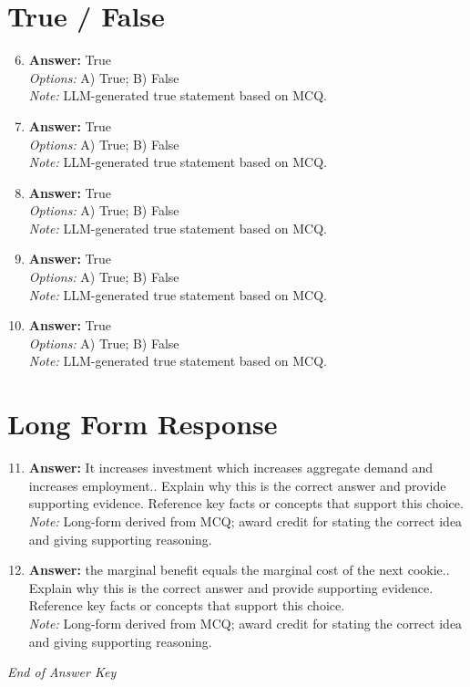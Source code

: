 \documentclass[12pt]{article}
\begin{document}
\section*{True / False}
\begin{enumerate}[label=\arabic*.]
\setcounter{enumi}{5}
\item \textbf{Answer:} True
\\ \textit{Options:} A) True; B) False
\\ \textit{Note:} LLM-generated true statement based on MCQ.
\item \textbf{Answer:} True
\\ \textit{Options:} A) True; B) False
\\ \textit{Note:} LLM-generated true statement based on MCQ.
\item \textbf{Answer:} True
\\ \textit{Options:} A) True; B) False
\\ \textit{Note:} LLM-generated true statement based on MCQ.
\item \textbf{Answer:} True
\\ \textit{Options:} A) True; B) False
\\ \textit{Note:} LLM-generated true statement based on MCQ.
\item \textbf{Answer:} True
\\ \textit{Options:} A) True; B) False
\\ \textit{Note:} LLM-generated true statement based on MCQ.
\end{enumerate}

\section*{Long Form Response}
\begin{enumerate}[label=\arabic*.]
\setcounter{enumi}{10}
\item \textbf{Answer:} It increases investment which increases aggregate demand and increases employment.. Explain why this is the correct answer and provide supporting evidence. Reference key facts or concepts that support this choice.
\\ \textit{Note:} Long-form derived from MCQ; award credit for stating the correct idea and giving supporting reasoning.
\item \textbf{Answer:} the marginal benefit equals the marginal cost of the next cookie.. Explain why this is the correct answer and provide supporting evidence. Reference key facts or concepts that support this choice.
\\ \textit{Note:} Long-form derived from MCQ; award credit for stating the correct idea and giving supporting reasoning.
\end{enumerate}

\vfill
\noindent\textit{End of Answer Key}
\end{document}
